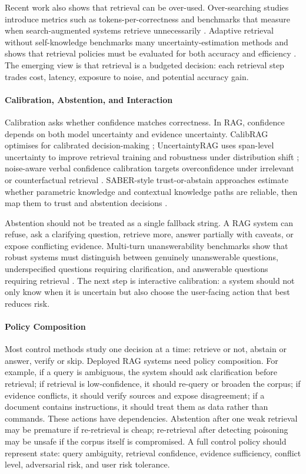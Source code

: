 Recent work also shows that retrieval can be over-used. Over-searching studies introduce metrics such as tokens-per-correctness and benchmarks that measure when search-augmented systems retrieve unnecessarily \citep{rrag006}. Adaptive retrieval without self-knowledge benchmarks many uncertainty-estimation methods and shows that retrieval policies must be evaluated for both accuracy and efficiency \citep{rrag034}. The emerging view is that retrieval is a budgeted decision: each retrieval step trades cost, latency, exposure to noise, and potential accuracy gain.

\paragraph{Calibration, Abstention, and Interaction}

Calibration asks whether confidence matches correctness. In RAG, confidence depends on both model uncertainty and evidence uncertainty. CalibRAG optimises for calibrated decision-making \citep{calibRAG2025}; UncertaintyRAG uses span-level uncertainty to improve retrieval training and robustness under distribution shift \citep{uncertaintyRAG2024}; noise-aware verbal confidence calibration targets overconfidence under irrelevant or counterfactual retrieval \citep{rrag007}. SABER-style trust-or-abstain approaches estimate whether parametric knowledge and contextual knowledge paths are reliable, then map them to trust and abstention decisions \citep{rrag002}.

Abstention should not be treated as a single fallback string. A RAG system can refuse, ask a clarifying question, retrieve more, answer partially with caveats, or expose conflicting evidence. Multi-turn unanswerability benchmarks show that robust systems must distinguish between genuinely unanswerable questions, underspecified questions requiring clarification, and answerable questions requiring retrieval \citep{rrag141}. The next step is interactive calibration: a system should not only know when it is uncertain but also choose the user-facing action that best reduces risk.

\paragraph{Policy Composition}

Most control methods study one decision at a time: retrieve or not, abstain or answer, verify or skip. Deployed RAG systems need policy composition. For example, if a query is ambiguous, the system should ask clarification before retrieval; if retrieval is low-confidence, it should re-query or broaden the corpus; if evidence conflicts, it should verify sources and expose disagreement; if a document contains instructions, it should treat them as data rather than commands. These actions have dependencies. Abstention after one weak retrieval may be premature if re-retrieval is cheap; re-retrieval after detecting poisoning may be unsafe if the corpus itself is compromised. A full control policy should represent state: query ambiguity, retrieval confidence, evidence sufficiency, conflict level, adversarial risk, and user risk tolerance.

